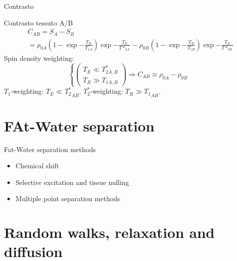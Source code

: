 \begin{frame}{Contrasto}
    \begin{block}{Contrasto tessuto A/B}
\begin{align*}
&C_{AB}=S_A-S_B\\
&=\rho_{0A}(1-\exp{-\frac{T_R}{T_{1A}}})\exp{-\frac{T_E}{T*_{2A}}}-\rho_{0B}(1-\exp{-\frac{T_R}{T_{1B}}})\exp{-\frac{T_E}{T*_{2B}}}
\end{align*}
Spin density weighting:
\begin{equation*}
\left\{\begin{pmatrix}T_E\ll T_{2A,B}^*\\ T_R\gg T_{1A,B}\end{pmatrix}\right.\Rightarrow C_{AB}\approx\rho_{0A}-\rho_{0B}
\end{equation*}
$T_1$-weighting: $T_E\ll {T_2^*}_{AB}$.
$T_2^*$-weighting: $T_R\gg {T_1}_{AB}$.
\end{block}
\end{frame}

\section{FAt-Water separation}

\begin{wordonframe}{Fat-Water separation methods}
\begin{itemize}
    \item Chemical shift
    \item Selective excitation and tissue nulling
    \item Multiple point separation methods
\end{itemize}
\end{wordonframe}

\section{Random walks, relaxation and diffusion}

